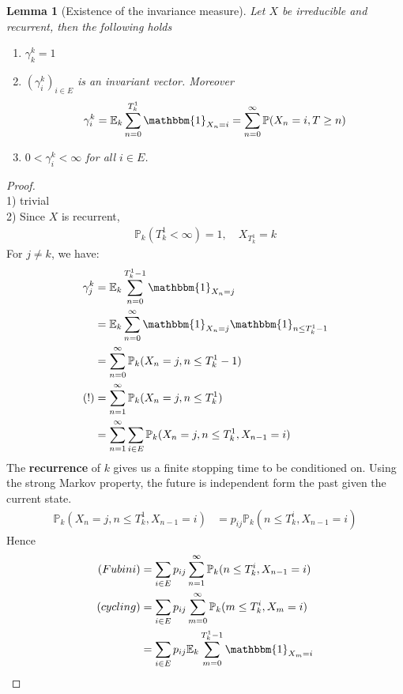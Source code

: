 \documentclass[a4paper,11pt]{book}
\newtheorem{lemma}[theorem]{Lemma}
\theoremstyle{definition}
\theoremstyle{remark}
\begin{document}
\begin{lemma}[Existence of the invariance measure]
	Let $X$ be irreducible and recurrent, then the following holds
	\begin{enumerate}
		\item $\gamma_k^k = 1$
		\item $ (\gamma^k_i)_{i \in E}$ is an invariant vector. Moreover
		\begin{align*}
			\gamma_i^k = \mathbb{E}_k \sum_{n = 0}^{T_k^1} \mathbbm{1}_{X_n = i} = \sum_{n = 0}^\infty \mathbb{P}(X_n = i, T \geq n)
		\end{align*}
		\item $0 < \gamma_i^k < \infty$ for all $i \in E$.
	\end{enumerate}
\end{lemma}
\begin{proof}\quad\\
1) trivial\\
2) Since $X$ is recurrent, 
	\begin{align*}
		\mathbb{P}_k( T_k^1 < \infty ) = 1,\quad X_{T_k^1 } = k
	\end{align*}
	For $j \neq k$, we have:
	\begin{align*}
		\gamma_j^k &= \mathbb{E}_k \sum_{n = 0}^{T_k^1 -1} \mathbbm{1}_{X_n = j}\\
		&= \mathbb{E}_k \sum_{n = 0}^\infty \mathbbm{1}_{X_n = j} \mathbbm{1}_{n \le T_k^1 -1}\\
		&= \sum_{n = 0}^\infty \mathbb{P}_k(X_n = j, n \le T_k^1 -1)\\
	(!)	&= \sum_{n = 1}^\infty \mathbb{P}_k(X_n = j, n \le T_k^1 )\\
		&= \sum_{n = 1}^\infty \sum_{i \in E} \mathbb{P}_k(X_n = j, n \le T_k^1, X_{n-1} = i )
	\end{align*}
	The \textbf{recurrence }of $k$ gives us a finite stopping time to be conditioned on. Using the strong Markov property, the future is independent form the past given the current state.
	\begin{align*}
		\mathbb{P}_k(X_n = j, n \le T_k^1, X_{n-1} = i) &= p_{ij} \mathbb{P}_k(n \le T_k^i, X_{n-1} = i)
	\end{align*}
	Hence
	\begin{align*}
	(Fubini)	&= \sum_{i \in E} p_{ij} \sum_{n = 1}^\infty \mathbb{P}_k(n \le T_k^i, X_{n-1} = i)\\
	(cycling)	&= \sum_{i \in E} p_{ij} \sum_{m = 0}^\infty \mathbb{P}_k(m \le T_k^i, X_{m} = i)\\
		&= \sum_{i \in E} p_{ij} \mathbb{E}_k \sum_{m = 0}^{T_k^1 -1} \mathbbm{1}_{X_m = i}\\

\end{align*}
\end{proof}
\end{document}

